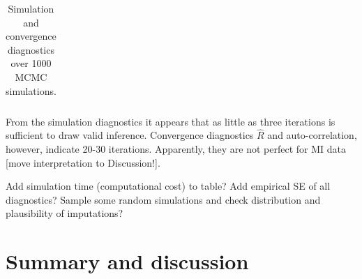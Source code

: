 \documentclass[article]{jss}
\begin{document}
\begin{table}[ht]
\begin{tabular}{lrrrrrrr}
   \hline
\end{tabular}
\caption{Simulation and convergence diagnostics over 1000 MCMC simulations.}
\label{subsetresults}
\end{table}

From the simulation diagnostics it appears that as little as three iterations is sufficient to draw valid inference. Convergence diagnostics $\widehat{R}$ and auto-correlation, however, indicate 20-30 iterations. Apparently, they are not perfect for MI data [move interpretation to Discussion!]. 

Add simulation time (computational cost) to table? Add empirical SE of all diagnostics? Sample some random simulations and check distribution and plausibility of imputations?








\section{Summary and discussion} \label{sec:summary}
\end{document}
